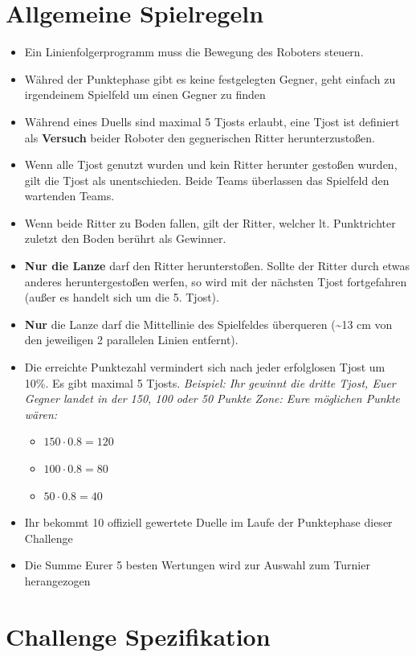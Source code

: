 \documentclass[a4paper,12pt]{article}
\begin{document}
\section{Allgemeine Spielregeln}
\begin{itemize}
	\item Ein Linienfolgerprogramm muss die Bewegung des Roboters steuern.
	\item Währed der Punktephase gibt es keine festgelegten Gegner, geht
		einfach zu irgendeinem Spielfeld um einen Gegner zu finden
	\item Während eines Duells sind maximal 5 Tjosts erlaubt, eine Tjost
		ist definiert als \textbf{Versuch} beider Roboter den
		gegnerischen Ritter herunterzustoßen.
	\item Wenn alle Tjost genutzt wurden und kein Ritter herunter
		gestoßen wurden, gilt die Tjost als unentschieden. Beide Teams
		überlassen das Spielfeld den wartenden Teams.
	\item Wenn beide Ritter zu Boden fallen, gilt der Ritter, welcher lt.
		Punktrichter zuletzt den Boden berührt als Gewinner.
	\item \textbf{Nur die Lanze} darf den Ritter herunterstoßen. Sollte der
		Ritter durch etwas anderes heruntergestoßen werfen, so wird mit
		der nächsten Tjost fortgefahren (außer es handelt sich um die
		5. Tjost).
	\item \textbf{Nur} die Lanze darf die Mittellinie des Spielfeldes
		überqueren (\textasciitilde13 cm von den jeweiligen 2
		parallelen Linien entfernt).
	\item Die erreichte Punktezahl vermindert sich nach jeder erfolglosen
		Tjost um 10\%. Es gibt maximal 5 Tjosts.
		\emph{Beispiel: Ihr gewinnt die dritte Tjost, Euer Gegner
		landet in der 150, 100 oder 50 Punkte Zone: Eure möglichen
		Punkte wären:}
		\begin{itemize}
			\item $150\cdot0.8 = 120$
			\item $100\cdot0.8 = 80$
			\item $50\cdot0.8 = 40$
		\end{itemize}
	\item Ihr bekommt 10 offiziell gewertete Duelle im Laufe der
		Punktephase dieser Challenge
	\item Die Summe Eurer 5 besten Wertungen wird zur Auswahl zum Turnier
		herangezogen
\end{itemize}
\section{Challenge Spezifikation}
\end{document}
